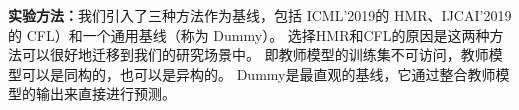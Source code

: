 \documentclass[fontset=macnew,UTF8]{article} %
\begin{document}
\textbf{实验方法：}我们引入了三种方法作为基线，包括 ICML’2019\cite{wu2019heterogeneous}的 HMR、IJCAI’2019\cite{luo2019knowledge}的 CFL）和一个通用基线（称为
Dummy）。 选择HMR和CFL的原因是这两种方法可以很好地迁移到我们的研究场景中。 即教师模型的训练集不可访问，教师模型可以是同构的，也可以是异构的。 Dummy是最直观的基线，它通过整合教师模型的输出来直接进行预测。

\begin{figure}[h!]
\end{figure}
\end{document}
